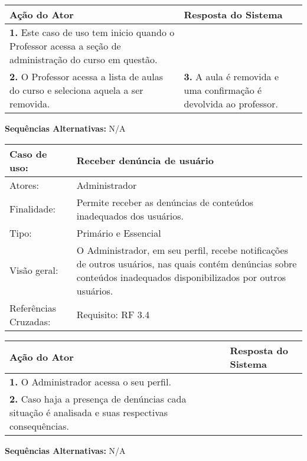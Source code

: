 \documentclass[12pt,a4paper,onecolumn,titlepage]{article}
\begin{document}
\begin{center}
\def\arraystretch{1.1}
\begin{tabular}{|p{6cm}|p{6cm}|}

\hline
\textbf{Ação do Ator} & \textbf{Resposta do Sistema} \\ \hline
\textbf{1.} Este caso de uso tem inicio quando o Professor acessa a seção de administração do curso em questão. & \\ \hline
\textbf{2.} O Professor acessa a lista de aulas do curso e seleciona aquela a ser removida.  &  \textbf{3.} A aula é removida e uma confirmação é devolvida ao professor.\\ \hline

\end{tabular}
\end{center}

\textbf{Sequências Alternativas:} N/A

\newpage

\begin{table}[h!]
\begin{center}
\begin{tabular}{p{2.5cm} p{9.5cm}}
Caso de uso: & \textbf{Receber denúncia de usuário} \\ \hline
Atores: & Administrador \\ \hline
Finalidade: & Permite receber as denúncias de conteúdos inadequados dos usuários. \\ \hline
Tipo: & Primário e Essencial \\ \hline
Visão geral: & O Administrador, em seu perfil, recebe notificações de outros usuários, nas quais contém denúncias sobre conteúdos inadequados disponibilizados por outros usuários. \\ \hline
Referências Cruzadas: & Requisito: RF 3.4

\end{tabular}
\end{center}
\end{table}

\begin{center}
\def\arraystretch{1.1}
\begin{tabular}{|p{6cm}|p{6cm}|}

\hline
\textbf{Ação do Ator} & \textbf{Resposta do Sistema} \\ \hline
\textbf{1.} O Administrador acessa o seu perfil.  & \\ \hline
\textbf{2.} Caso haja a presença de denúncias cada situação é analisada e suas respectivas consequências.  & \\ \hline 
\end{tabular}
\end{center}

\textbf{Sequências Alternativas:} N/A
\end{document}
